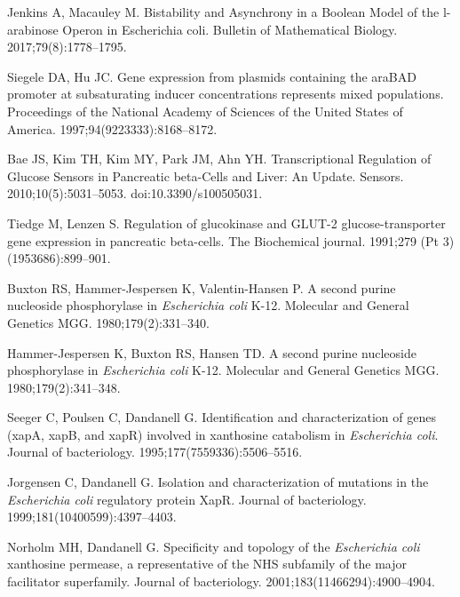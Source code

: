 \documentclass[10pt,letterpaper]{article}
\begin{document}
\begin{thebibliography}{10}
	Jenkins A, Macauley M.
	\newblock Bistability and Asynchrony in a Boolean Model of the l-arabinose
	Operon in Escherichia coli.
	\newblock Bulletin of Mathematical Biology. 2017;79(8):1778--1795.
	
	Siegele DA, Hu JC.
	\newblock Gene expression from plasmids containing the araBAD promoter at
	subsaturating inducer concentrations represents mixed populations.
	\newblock Proceedings of the National Academy of Sciences of the United States
	of America. 1997;94(9223333):8168--8172.
	
	Bae JS, Kim TH, Kim MY, Park JM, Ahn YH.
	\newblock Transcriptional Regulation of Glucose Sensors in Pancreatic
	beta-Cells and Liver: An Update.
	\newblock Sensors. 2010;10(5):5031–5053.
	\newblock doi:{10.3390/s100505031}.
	
	Tiedge M, Lenzen S.
	\newblock Regulation of glucokinase and GLUT-2 glucose-transporter gene
	expression in pancreatic beta-cells.
	\newblock The Biochemical journal. 1991;279 (Pt 3)(1953686):899--901.
	
	Buxton RS, Hammer-Jespersen K, Valentin-Hansen P.
	\newblock A second purine nucleoside phosphorylase in \emph{Escherichia coli}
	K-12.
	\newblock Molecular and General Genetics MGG. 1980;179(2):331--340.
	
	Hammer-Jespersen K, Buxton RS, Hansen TD.
	\newblock A second purine nucleoside phosphorylase in \emph{Escherichia coli}
	K-12.
	\newblock Molecular and General Genetics MGG. 1980;179(2):341--348.
	
	Seeger C, Poulsen C, Dandanell G.
	\newblock Identification and characterization of genes (xapA, xapB, and xapR)
	involved in xanthosine catabolism in \emph{Escherichia coli}.
	\newblock Journal of bacteriology. 1995;177(7559336):5506--5516.
	
	Jorgensen C, Dandanell G.
	\newblock Isolation and characterization of mutations in the \emph{Escherichia
		coli} regulatory protein XapR.
	\newblock Journal of bacteriology. 1999;181(10400599):4397--4403.
	
	Norholm MH, Dandanell G.
	\newblock Specificity and topology of the \emph{Escherichia coli} xanthosine
	permease, a representative of the NHS subfamily of the major facilitator
	superfamily.
	\newblock Journal of bacteriology. 2001;183(11466294):4900--4904.
	

\end{thebibliography}
\end{document}
